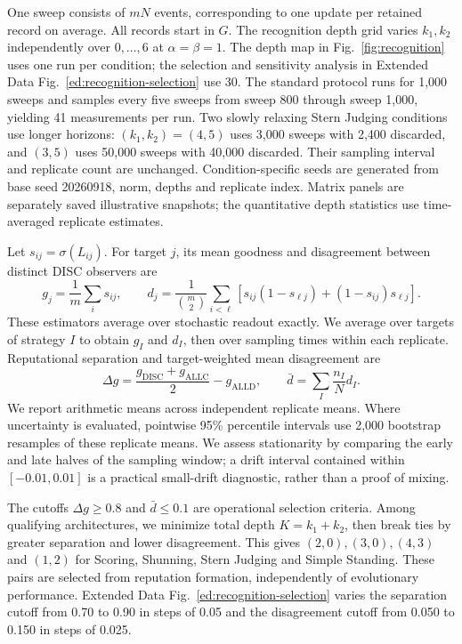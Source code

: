 \documentclass[fleqn,10pt]{article}
\begin{document}
One sweep consists of $mN$ events, corresponding to one update per retained record on average. All records start in $G$. The recognition depth grid varies $k_1,k_2$ independently over $0,\ldots,6$ at $\alpha=\beta=1$. The depth map in Fig.~\ref{fig:recognition} uses one run per condition; the selection and sensitivity analysis in Extended Data Fig.~\ref{ed:recognition-selection} use 30. The standard protocol runs for 1,000 sweeps and samples every five sweeps from sweep 800 through sweep 1,000, yielding 41 measurements per run. Two slowly relaxing Stern Judging conditions use longer horizons: $(k_1,k_2)=(4,5)$ uses 3,000 sweeps with 2,400 discarded, and $(3,5)$ uses 50,000 sweeps with 40,000 discarded. Their sampling interval and replicate count are unchanged. Condition-specific seeds are generated from base seed 20260918, norm, depths and replicate index. Matrix panels are separately saved illustrative snapshots; the quantitative depth statistics use time-averaged replicate estimates.

Let $s_{ij}=\sigma(L_{ij})$. For target $j$, its mean goodness and disagreement between distinct DISC observers are
\begin{equation}
g_j=\frac{1}{m}\sum_i s_{ij},\qquad
d_j=\frac{1}{\binom m2}\sum_{i<\ell}
\left[s_{ij}(1-s_{\ell j})+(1-s_{ij})s_{\ell j}\right].
\label{eq:methods-finite-estimators}
\end{equation}
These estimators average over stochastic readout exactly. We average over targets of strategy $I$ to obtain $g_I$ and $d_I$, then over sampling times within each replicate. Reputational separation and target-weighted mean disagreement are
\begin{equation}
\Delta g=\frac{g_{\mathrm{DISC}}+g_{\mathrm{ALLC}}}{2}-g_{\mathrm{ALLD}},
\qquad \bar d=\sum_I\frac{n_I}{N}d_I.
\label{eq:methods-recognition-statistics}
\end{equation}
We report arithmetic means across independent replicate means. Where uncertainty is evaluated, pointwise 95\% percentile intervals use 2,000 bootstrap resamples of these replicate means. We assess stationarity by comparing the early and late halves of the sampling window; a drift interval contained within $[-0.01,0.01]$ is a practical small-drift diagnostic, rather than a proof of mixing.

The cutoffs $\Delta g\geq0.8$ and $\bar d\leq0.1$ are operational selection criteria. Among qualifying architectures, we minimize total depth $K=k_1+k_2$, then break ties by greater separation and lower disagreement. This gives $(2,0),(3,0),(4,3)$ and $(1,2)$ for Scoring, Shunning, Stern Judging and Simple Standing. These pairs are selected from reputation formation, independently of evolutionary performance. Extended Data Fig.~\ref{ed:recognition-selection} varies the separation cutoff from 0.70 to 0.90 in steps of 0.05 and the disagreement cutoff from 0.050 to 0.150 in steps of 0.025.
\end{document}
